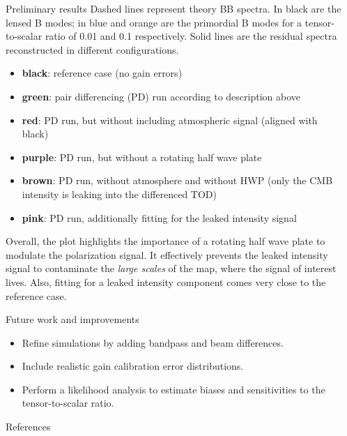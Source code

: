 \documentclass[final]{beamer}
\newlength{\sepwidth}
\newlength{\colwidth}
\newcommand{\separatorcolumn}{\begin{column}{\sepwidth}\end{column}}
\begin{document}
\begin{frame}[t]
\begin{columns}[t]
\begin{column}{\colwidth}
\begin{block}{Preliminary results}
        Dashed lines represent theory BB spectra.
        In black are the lensed B modes; in blue and orange are the primordial B modes for a tensor-to-scalar ratio of 0.01 and 0.1 respectively.
        Solid lines are the residual spectra reconstructed in different configurations.
        \begin{itemize}
          \item \textbf{black}: reference case (no gain errors)
          \item {\color{Green} \textbf{green}}: pair differencing (PD) run according to description above
          \item {\color{Red} \textbf{red}}: PD run, but without including atmospheric signal (aligned with black)
          \item {\color{Purple} \textbf{purple}}: PD run, but without a rotating half wave plate
          \item {\color{Sepia} \textbf{brown}}: PD run, without atmosphere and without HWP (only the CMB intensity is leaking into the differenced TOD)
          \item {\color{VioletRed} \textbf{pink}}: PD run, additionally fitting for the leaked intensity signal
        \end{itemize}

        Overall, the plot highlights the importance of a rotating half wave plate to modulate the polarization signal.
        It effectively prevents the leaked intensity signal to contaminate the \emph{large scales} of the map, where the signal of interest lives.
        Also, fitting for a leaked intensity component comes very close to the reference case.

      \end{block}

      \begin{block}{Future work and improvements}

        \begin{itemize}
          \item Refine simulations by adding bandpass and beam differences.
          \item Include realistic gain calibration error distributions.
          \item Perform a likelihood analysis to estimate biases and sensitivities to the tensor-to-scalar ratio.
        \end{itemize}

      \end{block}

      \begin{block}{References}

        \nocite{*}
        \footnotesize{\printbibliography}

      \end{block}

    \end{column}

    \separatorcolumn
  \end{columns}
\end{frame}
\end{document}
